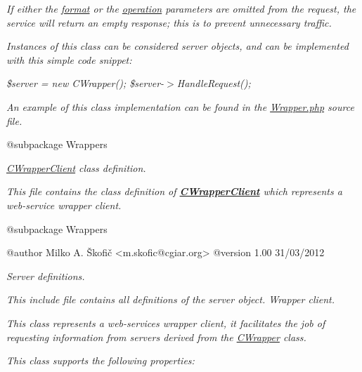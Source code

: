 {\itshape If either the \hyperlink{}{format} or the \hyperlink{}{operation} parameters are omitted from the request, the service will return an empty response; this is to prevent unnecessary traffic.}

{\itshape Instances of this class can be considered server objects, and can be implemented with this simple code snippet\-:}

{\itshape {\ttfamily  \$server = new C\-Wrapper(); \$server-\/$>$Handle\-Request(); }}

{\itshape An example of this class implementation can be found in the \hyperlink{}{Wrapper.\-php} source file.}

{\itshape \begin{DoxyVerb} @subpackage        Wrappers\end{DoxyVerb}
}

{\itshape {\itshape \hyperlink{class_c_wrapper_client}{C\-Wrapper\-Client}} class definition.}

{\itshape This file contains the class definition of {\bfseries \hyperlink{class_c_wrapper_client}{C\-Wrapper\-Client}} which represents a web-\/service wrapper client.}

{\itshape \begin{DoxyVerb} @subpackage        Wrappers

 @author            Milko A. Škofič <m.skofic@cgiar.org>
 @version   1.00 31/03/2012\end{DoxyVerb}
}

{\itshape Server definitions.}

{\itshape This include file contains all definitions of the server object. Wrapper client.}

{\itshape This class represents a web-\/services wrapper client, it facilitates the job of requesting information from servers derived from the \hyperlink{class_c_wrapper}{C\-Wrapper} class.}

{\itshape This class supports the following properties\-:}

